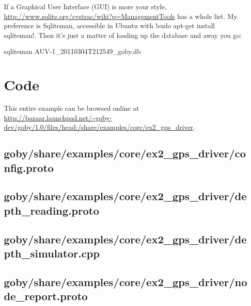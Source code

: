 If a Graphical User Interface (GUI) is more your style, \url{http://www.sqlite.org/cvstrac/wiki?p=ManagementTools} has a whole list. My preference is Sqliteman, accessible in Ubuntu with !sudo apt-get install sqliteman!. Then it's just a matter of loading up the database and away you go:
\begin{boxedverbatim}
sqliteman AUV-1_20110304T212549_goby.db
\end{boxedverbatim}
\resetbvlinenumber

\section{Code} \label{sec:gps_driver_example_code}

This entire example can be browsed online at \url{http://bazaar.launchpad.net/~goby-dev/goby/1.0/files/head:/share/examples/core/ex2_gps_driver}.

\subsection{goby/share/examples/core/ex2\_gps\_driver/config.proto} \label{sec:gps_driver:config.proto}
\resetbvlinenumber

\subsection{goby/share/examples/core/ex2\_gps\_driver/depth\_reading.proto} \label{sec:gps_driver:depth_reading.proto}
\resetbvlinenumber

\subsection{goby/share/examples/core/ex2\_gps\_driver/depth\_simulator.cpp} \label{sec:gps_driver:depth_simulator.cpp}
\resetbvlinenumber

\subsection{goby/share/examples/core/ex2\_gps\_driver/node\_report.proto} \label{sec:gps_driver:node_report.proto}
\resetbvlinenumber



